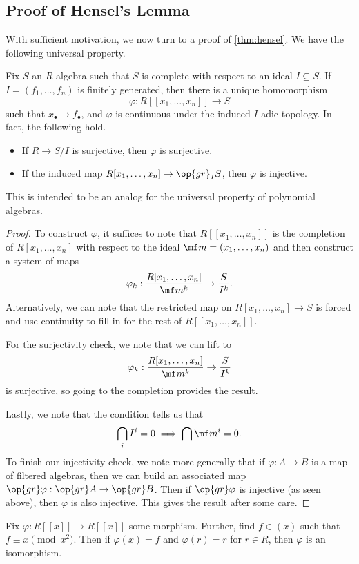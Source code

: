 \subsection{Proof of Hensel's Lemma}
With sufficient motivation, we now turn to a proof of \autoref{thm:hensel}. We have the following universal property.
\begin{proposition}
	Fix $S$ an $R$-algebra such that $S$ is complete with respect to an ideal $I\subseteq S$. If $I=(f_1,\ldots,f_n)$ is finitely generated, then there is a unique homomorphism
	\[\varphi:R[[x_1,\ldots,x_n]]\to S\]
	such that $x_\bullet\mapsto f_\bullet$, and $\varphi$ is continuous under the induced $I$-adic topology. In fact, the following hold.
	\begin{itemize}
		\item If $R\to S/I$ is surjective, then $\varphi$ is surjective.
		\item If the induced map $R[x_1,\ldots,x_n]\to\op{gr}_IS$, then $\varphi$ is injective.
	\end{itemize}
\end{proposition}
\begin{remark}
	This is intended to be an analog for the universal property of polynomial algebras.
\end{remark}
\begin{proof}
	To construct $\varphi$, it suffices to note that $R[[x_1,\ldots,x_n]]$ is the completion of $R[x_1,\ldots,x_n]$ with respect to the ideal $\mf m=(x_1,\ldots,x_n)$ and then construct a system of maps
	\[\varphi_k:\frac{R[x_1,\ldots,x_n]}{\mf m^k}\to\frac S{I^k}.\]
	Alternatively, we can note that the restricted map on $R[x_1,\ldots,x_n]\to S$ is forced and use continuity to fill in for the rest of $R[[x_1,\ldots,x_n]]$.

	For the surjectivity check, we note that we can lift to
	\[\varphi_k:\frac{R[x_1,\ldots,x_n]}{\mf m^k}\to\frac S{I^k}\]
	is surjective, so going to the completion provides the result.

	Lastly, we note that the condition tells us that
	\[\bigcap_iI^i=0\implies\bigcap\mf m^i=0.\]
	To finish our injectivity check, we note more generally that if $\varphi:A\to B$ is a map of filtered algebras, then we can build an associated map $\op{gr}\varphi:\op{gr}A\to\op{gr}B$. Then if $\op{gr}\varphi$ is injective (as seen above), then $\varphi$ is also injective. This gives the result after some care.
\end{proof}
\begin{corollary}
	Fix $\varphi:R[[x]]\to R[[x]]$ some morphism. Further, find $f\in(x)$ such that $f\equiv x\pmod{x^2}$. Then if $\varphi(x)=f$ and $\varphi(r)=r$ for $r\in R$, then $\varphi$ is an isomorphism.
\end{corollary}
